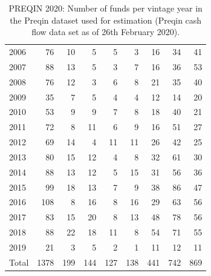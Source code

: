 \begin{table}[ht]
\begin{tabular}{lrrrrrrrr}
		2006 &  76 &  10 &   5 &   5 &   3 &  16 &  34 &  41 \\ 
		2007 &  88 &  13 &   5 &   3 &   7 &  16 &  36 &  53 \\ 
		2008 &  76 &  12 &   3 &   6 &   8 &  21 &  35 &  40 \\ 
		2009 &  35 &   7 &   5 &   4 &   4 &  12 &  14 &  20 \\ 
		2010 &  53 &   9 &   9 &   7 &   8 &  18 &  40 &  21 \\ 
		2011 &  72 &   8 &  11 &   6 &   9 &  16 &  51 &  27 \\ 
		2012 &  69 &  14 &   4 &  11 &  11 &  26 &  42 &  25 \\ 
		2013 &  80 &  15 &  12 &   4 &   8 &  32 &  61 &  30 \\ 
		2014 &  88 &  13 &  12 &   5 &  15 &  31 &  56 &  36 \\ 
		2015 &  99 &  18 &  13 &   7 &   9 &  38 &  86 &  47 \\ 
		2016 & 108 &   8 &  16 &   8 &  16 &  29 &  63 &  56 \\ 
		2017 &  83 &  15 &  20 &   8 &  13 &  48 &  78 &  56 \\ 
		2018 &  88 &  22 &  18 &  11 &   8 &  54 &  71 &  55 \\ 
		2019 &  21 &   3 &   5 &   2 &   1 &  11 &  12 &  11 \\ 
		\hline
		Total & 1378 & 199 & 144 & 127 & 138 & 441 & 742 & 869 \\ 
		\hline
		\hline
	\end{tabular}
	\caption{PREQIN 2020: Number of funds per vintage year in the Preqin dataset used for estimation (Preqin cash flow data set as of 26th February 2020).} 
	\label{tab:preqin_data}
\end{table}

